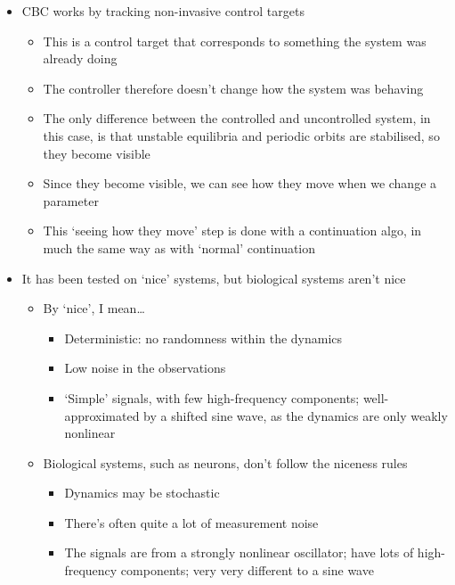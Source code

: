 \documentclass[11pt]{article}
\begin{document}
\begin{itemize}
\item CBC works by tracking non-invasive control targets
\begin{itemize}
\item This is a control target that corresponds to something the system was already doing
\item The controller therefore doesn't change how the system was behaving
\item The only difference between the controlled and uncontrolled system, in this case, is that unstable equilibria and periodic orbits are stabilised, so they become visible
\item Since they become visible, we can see how they move when we change a parameter
\item This `seeing how they move' step is done with a continuation algo, in much the same way as with `normal' continuation
\end{itemize}

\item It has been tested on `nice' systems, but biological systems aren't nice
\begin{itemize}
\item By `nice', I mean\ldots{}
\begin{itemize}
\item Deterministic: no randomness within the dynamics
\item Low noise in the observations
\item `Simple' signals, with few high-frequency components; well-approximated by a shifted sine wave, as the dynamics are only weakly nonlinear
\end{itemize}
\item Biological systems, such as neurons, don't follow the niceness rules
\begin{itemize}
\item Dynamics may be stochastic
\item There's often quite a lot of measurement noise
\item The signals are from a strongly nonlinear oscillator; have lots of high-frequency components; very very different to a sine wave
\end{itemize}
\end{itemize}


\end{itemize}
\end{document}
